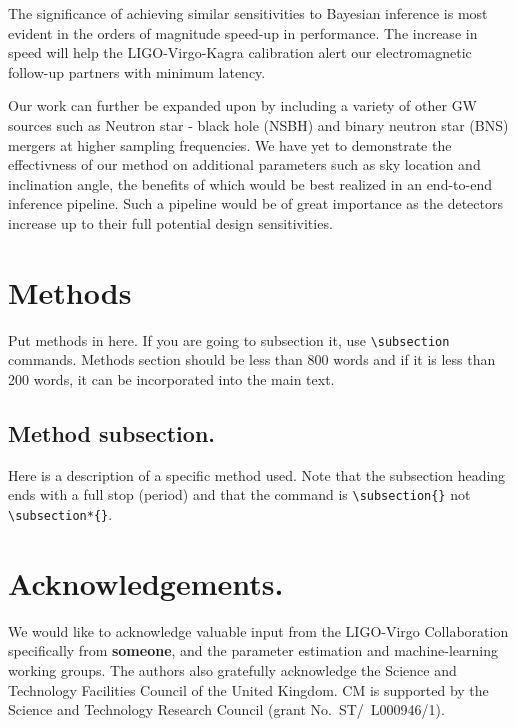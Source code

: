 \documentclass[%
showpacs,
 amsmath,amssymb,
 aps,
 twocolumn,
 prl,
 reprint,
floatfix,
]{revtex4-1}
\begin{document}
The significance of achieving similar sensitivities 
to Bayesian inference is most evident in the 
orders of magnitude speed-up in performance. The increase
in speed will help the LIGO-Virgo-Kagra calibration 
alert our electromagnetic follow-up partners with 
minimum latency.

Our work can further be expanded upon by including 
a variety of other GW sources such as Neutron star - 
black hole (NSBH) and binary neutron star (BNS) mergers 
at higher sampling frequencies. We have yet to demonstrate 
the effectivness of our method on additional parameters 
such as sky location and inclination angle, the benefits of which 
would be best realized in an end-to-end inference pipeline. 
Such a pipeline would be of great importance as the detectors 
increase up to their full potential design sensitivities.

\section{Methods}
Put methods in here.  If you are going to subsection it, use
\verb|\subsection| commands.  Methods section should be less than
800 words and if it is less than 200 words, it can be incorporated
into the main text.

\subsection{Method subsection.}

Here is a description of a specific method used.  Note that the
subsection heading ends with a full stop (period) and that the
command is \verb|\subsection{}| not \verb|\subsection*{}|.

%
%
\section{Acknowledgements.}
%
We would like to acknowledge valuable input from the LIGO-Virgo Collaboration
specifically from {\textbf{someone}}, and the parameter estimation and
machine-learning working groups. The authors also gratefully acknowledge the
Science and Technology Facilities Council of the United Kingdom. CM is
supported by the Science and Technology Research Council (grant
No.~ST/~L000946/1).
\end{document}
